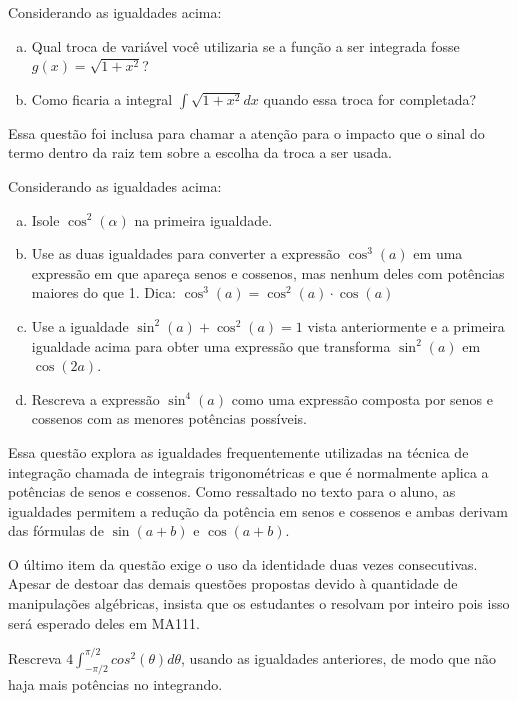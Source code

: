\documentclass[main_estudante.tex]{subfiles}
\begin{document}
\begin{questao}
Considerando as igualdades acima:
\begin{enumerate}[a)]
\item Qual troca de variável você utilizaria se a função a ser integrada fosse $g(x)=\sqrt{1+x^2}$?
\item Como ficaria a integral $\int \sqrt{1+x^2} dx$ quando essa troca for completada?
\end{enumerate}
\end{questao}

Essa questão foi inclusa para chamar a atenção para o impacto que o sinal do termo dentro da raiz tem sobre a escolha da troca a ser usada.

\begin{questao}
Considerando as igualdades acima:
\begin{enumerate}[a)]
\item Isole $\cos^2(\alpha)$ na primeira igualdade.
\item Use as duas igualdades para converter a expressão $\cos^3(a)$ em uma expressão em que apareça senos e cossenos, mas nenhum deles com potências maiores do que 1. Dica: $\cos^3(a) = \cos^2(a) \cdot \cos(a)$
\item Use a igualdade $\sin^2(a) + \cos^2(a)=1$ vista anteriormente e a primeira igualdade acima para obter uma expressão que transforma $\sin^2(a)$ em $\cos(2a)$.
\item Rescreva a expressão $\sin^4(a)$ como uma expressão composta por senos e cossenos com as menores potências possíveis.
\end{enumerate}
\end{questao}

Essa questão explora as igualdades frequentemente utilizadas na técnica de integração chamada de integrais trigonométricas e que é normalmente aplica a potências de senos e cossenos. Como ressaltado no texto para o aluno, as igualdades permitem a redução da potência em senos e cossenos e ambas derivam das fórmulas de $\sin(a+b)$ e $\cos(a+b)$.

O último item da questão exige o uso da identidade duas vezes consecutivas. Apesar de destoar das demais questões propostas devido à quantidade de manipulações algébricas, insista que os estudantes o resolvam por inteiro pois isso será esperado deles em MA111.

\begin{questao}
Rescreva $4\int_{-\pi/2}^{\pi/2} cos^2(\theta)d\theta$, usando as igualdades anteriores, de modo que não haja mais potências no integrando.
\end{questao}
\end{document}
